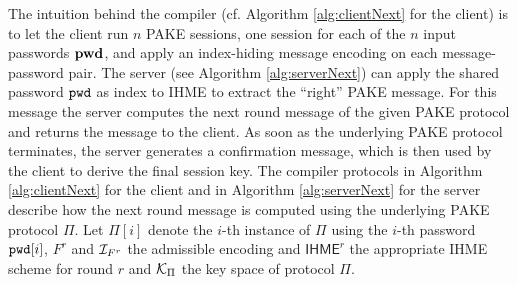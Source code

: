 \noindent{}

\noindent
The intuition behind the compiler (cf. Algorithm \ref{alg:clientNext} for the client) is to let the client run $n$ \ac{PAKE} sessions, one session for each of the $n$ input passwords $\mathtt{{\bf pwd}}$, and apply an index-hiding message encoding on each message-password pair.
The server (see Algorithm \ref{alg:serverNext}) can apply the shared password $\mathtt{pwd}$ as index to \ac{IHME} to extract the ``right'' \ac{PAKE} message. 
For this message the server computes the next round message of the given \ac{PAKE} protocol and returns the message to the client.
As soon as the underlying \ac{PAKE} protocol terminates, the server generates a confirmation message, which is then used by the client to derive the final session key.
The compiler protocols in Algorithm \ref{alg:clientNext} for the client and in Algorithm \ref{alg:serverNext} for the server describe how the next round message is computed using the underlying \ac{PAKE} protocol $\Pi$.
Let $\Pi[i]$ denote the $i$-th instance of $\Pi$ using the $i$-th password $\mathtt{pwd}[i]$, $F^r$ and $\mathcal{I}_{F^r}$ the admissible encoding and $\mathsf{IHME}^r$ the appropriate IHME scheme for round $r$ and $\mathcal{K}_\Pi$ the key space of protocol $\Pi$.

